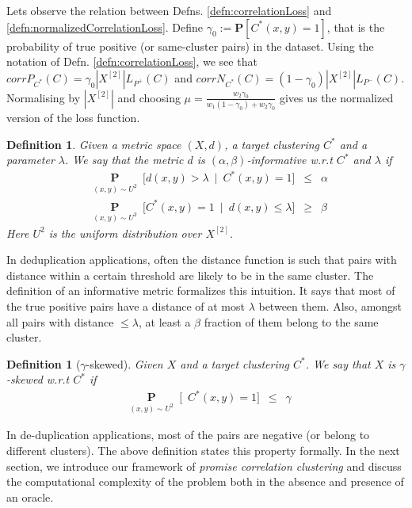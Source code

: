\documentclass[12pt]{article}
\newtheorem{definition}[theorem]{Definition}
\newcommand{\mb}{\mathbf}
\begin{document}
Lets observe the relation between Defns. \ref{defn:correlationLoss} and \ref{defn:normalizedCorrelationLoss}. Define $\gamma_0 := \mb P[C^*(x, y) = 1]$, that is the probability of true positive (or same-cluster pairs) in the dataset. Using the notation of Defn. \ref{defn:correlationLoss}, we see that $corrP_{C^*}(C) = \gamma_0|X^{[2]}| L_{P^+}(C)$ and $corrN_{C^*}(C) = (1-\gamma_0)|X^{[2]}| L_{P^-}(C)$. Normalising by $|X^{[2]}|$ and choosing $\mu = \frac{w_2 \gamma_0}{w_1 (1-\gamma_0) + w_2 \gamma_0}$ gives us the normalized version of the loss function.

\begin{definition}
\label{defn:informativeMetric}
Given a metric space $(X, d)$, a target clustering $C^*$ and a parameter $\lambda$. We say that the metric $d$ is $(\alpha, \beta)$-informative w.r.t $C^*$ and $\lambda$ if
\begin{align}
	&\underset{(x, y) \sim U^2}{\mb P}\enspace \big[d(x, y) > \lambda \enspace|\enspace C^*(x, y) = 1\big] \enspace \le \enspace \alpha \label{eqn:alphaInformative}\\
	&\underset{(x, y) \sim U^2}{\mb P}\enspace \big[C^*(x, y) = 1 \enspace|\enspace d(x, y) \le \lambda \big] \enspace \ge \enspace \beta \label{eqn:betaInformative}
\end{align}
Here $U^2$ is the uniform distribution over $X^{[2]}$. 
\end{definition} 
In deduplication applications, often the distance function is such that pairs with distance within a certain threshold are likely to be in the same cluster. The definition of an informative metric formalizes this intuition. It says that most of the true positive pairs have a distance of at most $\lambda$ between them. Also, amongst all pairs with distance $\le \lambda$, at least a $\beta$ fraction of them belong to the same cluster. 

\begin{definition}[$\gamma$-skewed] 
\label{defn:gammaskewed} 
Given $X$ and a target clustering $C^*$. We say that $X$ is $\gamma$-skewed w.r.t $C^*$ if 
\begin{align*}
	&\underset{(x, y) \sim U^2}{\mb P}\enspace \big[\enspace C^*(x, y) = 1 \big] \enspace \le \enspace \gamma
\end{align*}
\end{definition}
In de-duplication applications, most of the pairs are negative (or belong to different clusters). The above definition states this property formally. In the next section, we introduce our framework of \textit{promise correlation clustering} and discuss the computational complexity of the problem both in the absence and presence of an oracle.   
\end{document}
